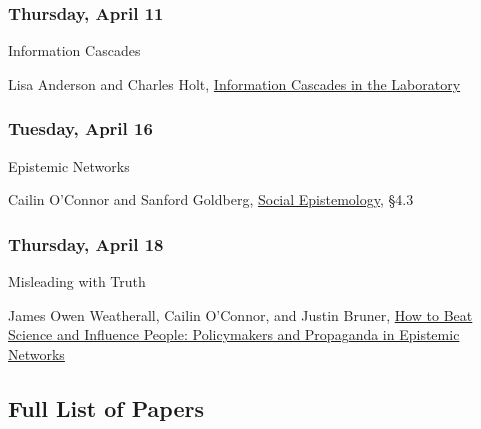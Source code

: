 \documentclass[
  12pt,
  letterpaper,
  DIV=11,
  numbers=noendperiod]{scrartcl}
\providecommand{\tightlist}{%
  \setlength{\itemsep}{0pt}\setlength{\parskip}{0pt}}\usepackage{longtable,booktabs,array}
\begin{document}
\subsubsection{Thursday, April 11}\label{thursday-april-11}

\begin{description}
\tightlist
\item[Topic]
Information Cascades
\item[Reading (read \textbf{after} class)]
Lisa Anderson and Charles Holt,
\href{https://www.jstor.org/stable/2951328}{Information Cascades in the
Laboratory}
\end{description}

\subsubsection{Tuesday, April 16}\label{tuesday-april-16}

\begin{description}
\tightlist
\item[Topic]
Epistemic Networks
\item[Reading]
Cailin O'Connor and Sanford Goldberg,
\href{https://plato.stanford.edu/entries/epistemology-social/\#NetwEpisMode}{Social
Epistemology}, §4.3
\end{description}

\subsubsection{Thursday, April 18}\label{thursday-april-18}

\begin{description}
\tightlist
\item[Topic]
Misleading with Truth
\item[Reading]
James Owen Weatherall, Cailin O'Connor, and Justin Bruner,
\href{https://www.journals.uchicago.edu/doi/abs/10.1093/bjps/axy062}{How
to Beat Science and Influence People: Policymakers and Propaganda in
Epistemic Networks}
\end{description}

\newpage

\subsection{Full List of Papers}\label{full-list-of-papers}
\end{document}
